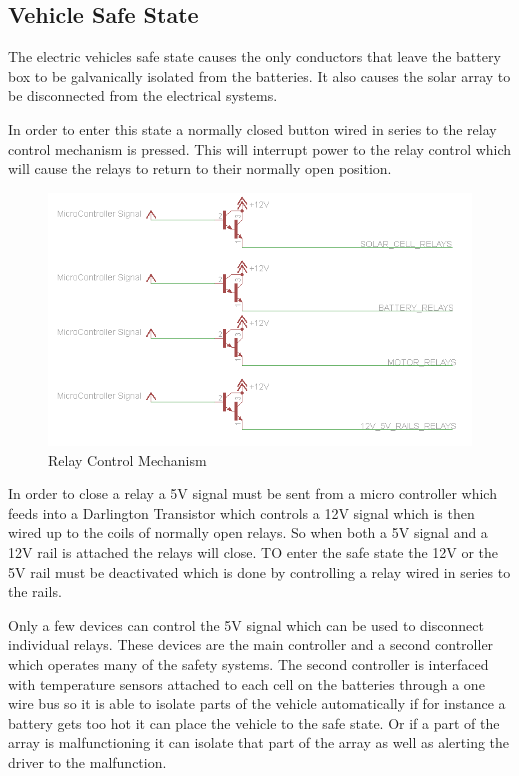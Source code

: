 \subsection{Vehicle Safe State}
The electric vehicles safe state causes the only conductors that leave the battery box to be galvanically isolated from the batteries. It also causes the solar array to be disconnected from the electrical systems. 

In order to enter this state a normally closed button wired in series to the relay control mechanism is pressed. This will interrupt power to the relay control which will cause the relays to return to their normally open position.

\begin{figure}[H]
\includegraphics[width=\columnwidth]{figures/RelayControl.png}%
\caption{Relay Control Mechanism}
\label{Fig:RelayControl}
\end{figure}

In order to close a relay a 5V signal must be sent from a micro controller which feeds into a Darlington Transistor which controls a 12V signal which is then wired up to the coils of normally open relays. So when both a 5V signal and a 12V rail is attached the relays will close. TO enter the safe state the 12V or the 5V rail must be deactivated which is done by controlling a relay wired in series to the rails.

Only a few devices can control the 5V signal which can be used to disconnect individual relays. These devices are the main controller and a second controller which operates many of the safety systems. The second controller is interfaced with temperature sensors attached to each cell on the batteries through a one wire bus so it is able to isolate parts of the vehicle automatically if for instance a battery gets too hot it can place the vehicle to the safe state. Or if a part of the array is malfunctioning it can isolate that part of the array as well as alerting the driver to the malfunction.

